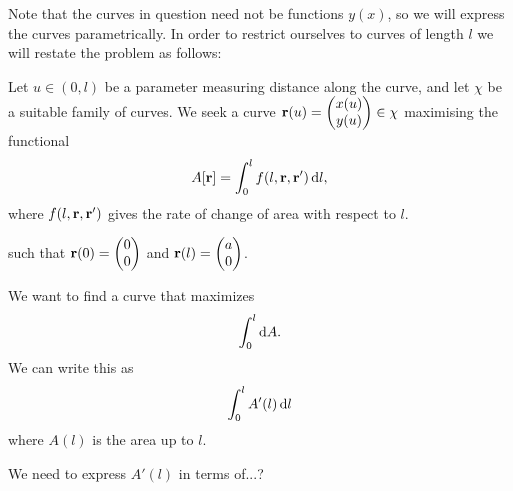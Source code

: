 \newpage
Note that the curves in question need not be functions $y(x)$, so we will express the curves
parametrically. In order to restrict ourselves to curves of length $l$ we will restate the problem
as follows:

Let $u \in (0, l)$ be a parameter measuring distance along the curve, and let $\chi$ be a suitable family of
curves. We seek a curve $\mathbf{r}(u) = \begin{pmatrix}x(u)\\y(u)\end{pmatrix} \in \chi$ maximising the functional
\begin{align*}
  A[\r] = \int_0^l f(l, \r, \r') \d l,
\end{align*}
where $f(l, \mathbf{r}, \mathbf{r}')$ gives the rate of change of area with respect to $l$.

such that $\mathbf{r}(0) = \begin{pmatrix}0\\0\end{pmatrix}$ and $\mathbf{r}(l) = \begin{pmatrix}a\\0\end{pmatrix}$.

\newpage
We want to find a curve that maximizes
\begin{align*}
  \int_0^l \d A.
\end{align*}
We can write this as
\begin{align*}
  \int_0^l A'(l) \d l
\end{align*}
where $A(l)$ is the area up to $l$.

We need to express $A'(l)$ in terms of...?

